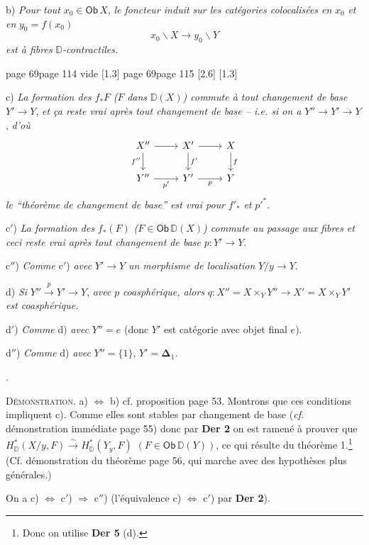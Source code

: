 \documentclass[11pt,leqno]{article}
\newcommand{\printedpage}[1]{\marginnote{\scriptsize\sffamily ed.\ #1}}
\newcommand{\msp}[1]{%
  \begingroup\def\thismsp{#1}\def\blankmsp{page 114 vide}%
  \ifx\thismsp\blankmsp
    \marginnote{\scriptsize\sffamily [114: vide]}[1.3\baselineskip]%
  \else\def\followingmsp{page 115}%
    \ifx\thismsp\followingmsp
      \marginnote{\scriptsize\sffamily [page 115]}[2.6\baselineskip]%
    \else\marginnote{\scriptsize\sffamily [#1]}[1.3\baselineskip]\fi
  \fi\endgroup}
\newcommand{\Ob}{\ensuremath{\mathsf{Ob}}}
\newcommand{\D}{\ensuremath{\mathbb{D}}}
\begin{document}
b) \textit{Pour tout} $x_0 \in \Ob\, X$, \textit{le foncteur induit sur les catégories colocalisées en} $x_0$ \textit{et en} $y_0 = f(x_0)$
\[
x_0\backslash X \longrightarrow y_0\backslash Y
\]
\textit{est à fibres} $\D$\textit{-contractiles.}

\msp{page 69}

c) \textit{La formation des} $f_*F$ \textit{(}$F$ \textit{dans} $\D(X)$\textit{) commute à tout changement de base} $Y' \to Y$, \textit{et ça reste vrai après tout changement de base -- i.e. si on a} $Y'' \to Y' \to Y$, \textit{d'où}
\[
\begin{tikzcd}
X'' \arrow[r] \arrow[d, "f''"{swap}] & X' \arrow[r] \arrow[d, "f'"] & X \arrow[d, "f"] \\
Y'' \arrow[r, "p'"{swap}] & Y' \arrow[r, "p"{swap}] & Y
\end{tikzcd}
\]
\textit{le “théorème de changement de base” est vrai pour} $f'_*$ \textit{et} $p'^{*}$.

c$'$) \textit{La formation des} $f_*(F)$ \textit{(}$F \in \Ob\, \D(X)$\textit{) commute au passage aux fibres et ceci reste vrai après tout changement de base} $p : Y' \to Y$.

c$''$) \textit{Comme} c$'$) \textit{avec} $Y' \to Y$ \textit{un morphisme de localisation} $Y/y \to Y$.

d) \textit{Si} $Y'' \overset{p}{\to} Y' \to Y$, \textit{avec} $p$ \textit{coasphérique, alors} $q : X'' = X \times_Y Y'' \to X' = X \times_Y Y'$ \textit{est coasphérique.}

\printedpage{41}

d$'$) \textit{Comme} d) \textit{avec} $Y'' = e$ (donc $Y'$ est catégorie avec objet final $e$).

d$''$) \textit{Comme} d) \textit{avec} $Y'' = \{1\}$, $Y' = \boldsymbol{\Delta}_1$.

.

\noindent\textsc{Démonstration}. a) $\Leftrightarrow$ b) cf. proposition page 53. Montrons que ces conditions impliquent c). Comme elles sont stables par changement de base (\textit{cf.} démonstration immédiate page 55) donc par \textbf{Der 2} on est ramené à prouver que $H^*_{\D}(X/y, F) \overset{\sim}{\to} H^*_{\D}(Y_y, F)$ $(F \in \Ob\, \D(Y))$, ce qui résulte du théorème 1.\footnote[30]{Donc on utilise \textbf{Der 5} (d).} (Cf. démonstration du théorème page 56, qui marche avec des hypothèses plus générales.)

On a c) $\Leftrightarrow$ c$'$) $\Rightarrow$ c$''$) (l'équivalence c) $\Leftrightarrow$ c$'$) par \textbf{Der 2}).
\end{document}
